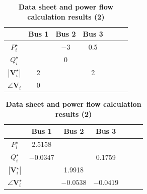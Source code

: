 \documentclass[graybox, envcountchap]{svmult}
\begin{document}
\begin{table}[h]
\medskip
\caption{\textbf{Data sheet and power flow calculation results (2)}} \label{table:pflow2}
 \centering
  {
  \begin{minipage}{0.49\linewidth}
    \centering
  \begin{tabular}{|c|c|c|c|c|c|c|}
    \hline
  & Bus 1 & Bus 2 & Bus 3 \\
    \hline 
    $P_i^{\star}$ &  & $-3$ & 0.5 \\
    \hline    
    $Q_i^{\star}$ &  & 0 & \\
    \hline
    $|\bm{V}_i^{\star}|$ & 2 & & 2 \\
    \hline
    $\angle \bm{V}_i$ & 0 & &  \\
    \hline
  \end{tabular}
  \end{minipage}
  \begin{minipage}{0.49\linewidth}
    \centering
  \begin{tabular}{|c|c|c|c|c|c|c|}
    \hline
    & Bus 1 & Bus 2 & Bus 3 \\
    \hline 
    $P_i^{\star}$ & 2.5158 & &  \\
    \hline
    $Q_i^{\star}$ & $-0.0347$ & & 0.1759 \\
    \hline
    $|\bm{V}_i^{\star}|$ & & 1.9918 & \\
    \hline
    $\angle \bm{V}_i^{\star}$ & & $-0.0538$ & $-0.0419$ \\
    \hline
  \end{tabular}
  \end{minipage}
  }
\end{table}
\end{document}
